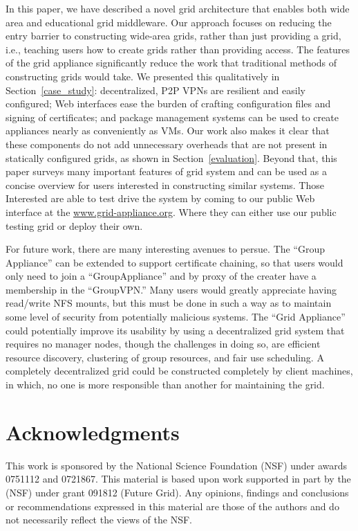 \documentclass[conference]{IEEEtran}
\begin{document}
In this paper, we have described a novel grid architecture that enables both
wide area and educational grid middleware.  Our approach focuses on reducing
the entry barrier to constructing wide-area grids, rather than just providing a
grid, i.e., teaching users how to create grids rather than providing access.
The features of the grid appliance significantly reduce the work that
traditional methods of constructing grids would take.  We presented this
qualitatively in Section~\ref{case_study}:  decentralized, P2P VPNs are
resilient and easily configured; Web interfaces ease the burden of crafting
configuration files and signing of certificates; and package management systems
can be used to create appliances nearly as conveniently as VMs.  Our work also
makes it clear that these components do not add unnecessary overheads that are
not present in statically configured grids, as shown in
Section~\ref{evaluation}.  Beyond that, this paper surveys many important
features of grid system and can be used as a concise overview for users
interested in constructing similar systems.  Those Interested are able to test
drive the system by coming to our public Web interface at the
\url{www.grid-appliance.org}.  Where they can either use our public testing
grid or deploy their own.

For future work, there are many interesting avenues to persue.  The ``Group
Appliance'' can be extended to support certificate chaining, so that users
would only need to join a ``GroupAppliance'' and by proxy of the creater have
a membership in the ``GroupVPN.''  Many users would greatly appreciate having
read/write NFS mounts, but this must be done in such a way as to maintain some
level of security from potentially malicious systems.  The ``Grid Appliance''
could potentially improve its usability by using a decentralized grid system
that requires no manager nodes, though the challenges in doing so, are
efficient resource discovery, clustering of group resources, and fair use
scheduling.  A completely decentralized grid could be constructed completely by
client machines, in which, no one is more responsible than another for
maintaining the grid.

\section*{Acknowledgments}

This work is sponsored by the National Science Foundation (NSF) under awards
0751112 and 0721867.  This material is based upon work supported in part by the
(NSF) under grant 091812 (Future Grid).  Any opinions, findings and conclusions
or recommendations expressed in this material are those of the authors and do
not necessarily reflect the views of the NSF.



\end{document}
